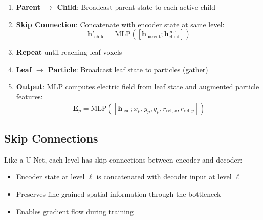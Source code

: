 \documentclass[11pt,a4paper]{article}
\begin{document}
\begin{enumerate}
    \item \textbf{Parent $\to$ Child}: Broadcast parent state to each active child
    \item \textbf{Skip Connection}: Concatenate with encoder state at same level:
    \begin{equation}
        \mathbf{h}'_{\text{child}} = \text{MLP}\left( [\mathbf{h}_{\text{parent}}; \mathbf{h}_{\text{child}}^{\text{enc}}] \right)
    \end{equation}
    \item \textbf{Repeat} until reaching leaf voxels
    \item \textbf{Leaf $\to$ Particle}: Broadcast leaf state to particles (gather)
    \item \textbf{Output}: MLP computes electric field from leaf state and augmented particle features:
    \begin{equation}
        \mathbf{E}_p = \text{MLP}\left( [\mathbf{h}_{\text{leaf}}; x_p, y_p, q_p, r_{\text{rel},x}, r_{\text{rel},y}] \right)
    \end{equation}
\end{enumerate}

\subsection{Skip Connections}

Like a U-Net, each level has skip connections between encoder and decoder:
\begin{itemize}
    \item Encoder state at level $\ell$ is concatenated with decoder input at level $\ell$
    \item Preserves fine-grained spatial information through the bottleneck
    \item Enables gradient flow during training
\end{itemize}
\end{document}
